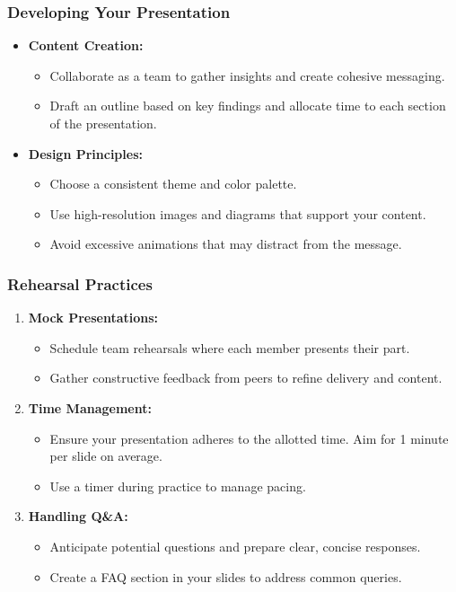 \documentclass[aspectratio=169]{beamer}
\begin{document}
\begin{frame}[fragile]
    \frametitle{Developing Your Presentation}
    
    \begin{itemize}
        \item \textbf{Content Creation:}
        \begin{itemize}
            \item Collaborate as a team to gather insights and create cohesive messaging.
            \item Draft an outline based on key findings and allocate time to each section of the presentation.
        \end{itemize}
        
        \item \textbf{Design Principles:}
        \begin{itemize}
            \item Choose a consistent theme and color palette.
            \item Use high-resolution images and diagrams that support your content.
            \item Avoid excessive animations that may distract from the message.
        \end{itemize}
    \end{itemize}
\end{frame}

\begin{frame}[fragile]
    \frametitle{Rehearsal Practices}
    
    \begin{enumerate}
        \item \textbf{Mock Presentations:}
        \begin{itemize}
            \item Schedule team rehearsals where each member presents their part.
            \item Gather constructive feedback from peers to refine delivery and content.
        \end{itemize}
            
        \item \textbf{Time Management:}
        \begin{itemize}
            \item Ensure your presentation adheres to the allotted time. Aim for 1 minute per slide on average.
            \item Use a timer during practice to manage pacing.
        \end{itemize}
            
        \item \textbf{Handling Q\&A:}
        \begin{itemize}
            \item Anticipate potential questions and prepare clear, concise responses.
            \item Create a FAQ section in your slides to address common queries.
        \end{itemize}
    \end{enumerate}
\end{frame}
\end{document}
